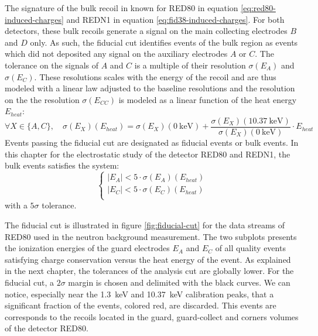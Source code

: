 The signature of the bulk recoil in known for RED80 in equation \ref{eq:red80-induced-charges} and REDN1 in equation \ref{eq:fid38-induced-charges}. For both detectors, these bulk recoils generate a signal on the main collecting electrodes $B$ and $D$ only. As such, the fiducial cut identifies events of the bulk region as events which did not deposited any signal on the auxiliary electrodes $A$ or $C$. The tolerance on the signals of $A$ and $C$ is a multiple of their resolution $\sigma(E_A)$ and $\sigma(E_C)$. These resolutions scales with the energy of the recoil and are thus modeled with a linear law adjusted to the baseline resolutions and the resolution on the 
the resolution $\sigma(E_{CC})$ is modeled as a linear function of the heat energy $E_{heat}$:
\begin{equation}
\forall X \in \{A, C \}, \quad 
\sigma(E_{X})(E_{heat})
=
\sigma(E_{X})(\SI{0}{\kilo\eV}) + \frac{\sigma(E_{X})(\SI{10.37}{\kilo\eV})}{\sigma(E_{X})(\SI{0}{\kilo\eV})} \cdot E_{heat}
\end{equation}
Events passing the fiducial cut are designated as fiducial events or bulk events. In this chapter for the electrostatic study of the detector RED80 and REDN1, the bulk events satisfies the system:
\begin{equation}
\begin{cases}
|E_A| < 5 \cdot \sigma(E_A)(E_{heat}) \\
|E_C| < 5 \cdot \sigma(E_C)(E_{heat}) \\
\end{cases}
\end{equation}
with a $5\sigma$ tolerance.

The fiducial cut is illustrated in figure \ref{fig:fiducial-cut} for the data streams of RED80 used in the neutron background measurement. The two subplots presents the ionization energies of the guard electrodes $E_A$ and $E_C$ of all quality events satisfying charge conservation versus the heat energy of the event. As explained in the next chapter, the tolerances of the analysis cut are globally lower. For the fiducial cut, a $2\sigma$ margin is chosen and delimited with the black curves. We can notice, especially near the \SI{1.3}{\kilo\eV} and \SI{10.37}{\kilo\eV} calibration peaks, that a significant fraction of the events, colored red, are discarded. This events are corresponds to the recoils located in the guard, guard-collect and corners volumes of the detector RED80.

